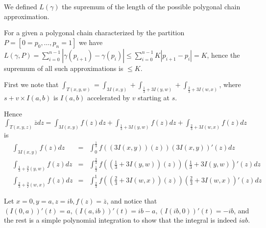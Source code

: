 \begin{cExercise}
	We defined $L(\gamma)$ the supremum of the length of the possible polygonal chain approximation.
	
	For a given a polygonal chain characterized by the partition $P=[0=p_0,\ldots, p_n=1]$ we have $L(\gamma, P)=\sum_{i=0}^{n-1}|\gamma(p_{i+1})-\gamma(p_i)|\le \sum_{i=0}^{n-1}K|p_{i+1}-p_i|=K$, hence the supremum of all such approximations is $\le K$.
\end{cExercise}
\begin{cExercise}
	First we note that $\int_{T(x,y,w)}=\int_{3I(x,y)}+\int_{\frac13+3I(y,w)}+\int_{\frac23+3I(w,x)}$, where $s+v\times I(a,b)$ is $I(a,b)$ accelerated by $v$ starting at $s$.

	Hence $\int_{T(x,y,z)}\overline zdz=\int_{3I(x,y)}f(z)dz+\int_{\frac13+3I(y,w)}f(z)dz+\int_{\frac23+3I(w,x)}f(z)dz$ is
	\begin{align*}
		&\int_{3I(x,y)}f(z)dz&=&\int_0^{\frac13}f((3I(x,y))(z))(3I(x,y))'(z)dz\\
		&\int_{\frac13+\frac3I(y,w)}f(z)dz&=&\int_{\frac13}^{\frac23}f\left(\left(\frac13+3I(y,w)\right)(z)\right)\left(\frac13+3I(y,w)\right)'(z)dz\\
		&\int_{\frac23+\frac3I(w,x)}f(z)dz&=&\int_{\frac23}^{1}f\left(\left(\frac23+3I(w,x)\right)(z)\right)\left(\frac23+3I(w,x)\right)'(z)dz
	\end{align*}


	Let $x=0,y=a,z=ib, f(z)=\overline{z}$, and notice that $(I(0,a))'(t)=a, (I(a,ib))'(t)=ib-a, (I(ib, 0))'(t)=-ib$, and the rest is a simple polynomial integration to show that the integral is indeed $iab$.
\end{cExercise}
